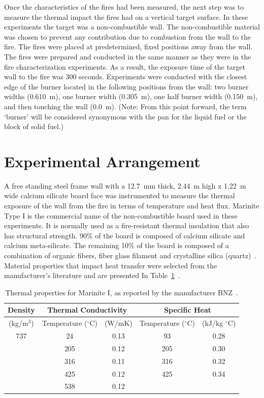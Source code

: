 \documentclass[twoside]{uocthesis}
\begin{document}
{Once the characteristics of the fires had been measured, the next step was to measure the thermal impact the fires had on a vertical target surface.  In these experiments the target was a non-combustible wall. The non-combustible material was chosen to prevent any contribution due to combustion from the wall to the fire.  The fires were placed at predetermined, fixed positions away from the wall. The fires were prepared and conducted in the same manner as they were in the fire characterization experiments. As a result, the exposure time of the target wall to the fire was 300 seconds.  Experiments were conducted with the closest edge of the burner located in the following positions from the wall: two burner widths (0.610~m), one burner width (0.305~m), one half burner width (0.150~m), and then touching the wall (0.0~m).  (Note: From this point forward, the term `burner' will be considered synonymous with the pan for the liquid fuel or the block of solid fuel.)

\section{Experimental Arrangement}

A free standing steel frame wall with a 12.7~mm thick, 2.44~m high x 1.22~m wide calcium silicate board face was instrumented to measure the thermal exposure of the wall from the fire in terms of temperature and heat flux. Marinite Type I is the commercial name of the non-combustible board used in these experiments.  It is normally used as a fire-resistant thermal insulation that also has structural strength. 90\% of the board is composed of calcium silicate and calcium meta-silicate.  The remaining 10\% of the board is composed of a combination of organic fibers, fiber glass filament and crystalline silica (quartz)~\cite{BNZ:MSDS}.  Material properties that impact heat transfer were selected from the manufacturer's literature and are presented In Table~\ref{tab:Marinite_Thermal_Properties}~\cite{Marinite:1997}.

\begin{table}[h]
	\centering
\begin{tabular}{|c|c|c|c|c|}
	\hline Density & \multicolumn{2}{c|}{Thermal Conductivity} & \multicolumn{2}{c|}{Specific Heat}   \\
	\hline (kg/m$^3$) & Temperature ($^\circ$C) & (W/mK)  & Temperature ($^\circ$C)  & (kJ/kg $^\circ$C) \\ \hline
	\hline 737  & 24 & 0.13 & 93 & 0.28 \\
	\hline  & 205 & 0.12  & 205 & 0.30 \\
	\hline  & 316 & 0.11 & 316 & 0.32 \\
	\hline  & 425 & 0.12 & 425 & 0.34 \\
	\hline  & 538 & 0.12 &  &  \\
	\hline
\end{tabular}
\caption[Thermal properties for Marinite I]{Thermal properties for Marinite I, as reported by the manufacturer BNZ~\cite{Marinite:1997}.}
\label{tab:Marinite_Thermal_Properties}
\end{table}

}
\end{document}
